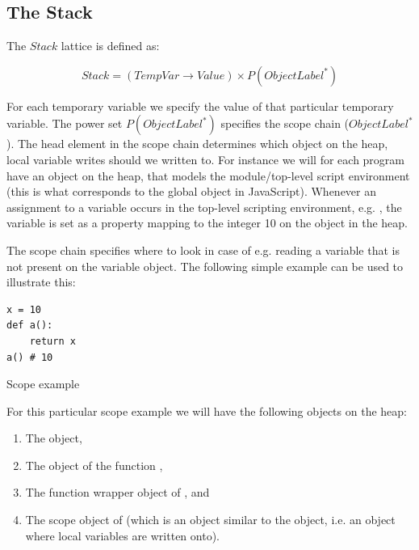 \subsection{The Stack}
The $Stack$ lattice is defined as:

\begin{equation*}
Stack = (TempVar \rightarrow Value) \times P(ObjectLabel^{*})
\end{equation*}

For each temporary variable we specify the value of that particular temporary variable. The power set $P(ObjectLabel^{*})$ specifies the scope chain ($ObjectLabel^{*}$). The head element in the scope chain determines which object on the heap, local variable writes should we written to. For instance we will for each program have an object on the heap, that models the module/top-level script environment \cite{pyref.main} (this is what corresponds to the global object in JavaScript). Whenever an assignment to a variable occurs in the top-level scripting environment, e.g. , the variable  is set as a property mapping to the integer 10 on the  object in the heap.

The scope chain specifies where to look in case of e.g. reading a variable that is not present on the variable object. The following simple example can be used to illustrate this:

\begin{listing}[H]
	\begin{verbatim}
x = 10
def a():
	return x
a() # 10
	\end{verbatim}
\caption{Scope example}\label{code:ScopeExample}
\end{listing}

For this particular scope example we will have the following objects on the heap:

\begin{enumerate}
  \item The  object,
  \item The object of the function ,
  \item The function wrapper object of , and
  \item The scope object of  (which is an object similar to the  object, i.e. an object where local variables are written onto).
\end{enumerate}

